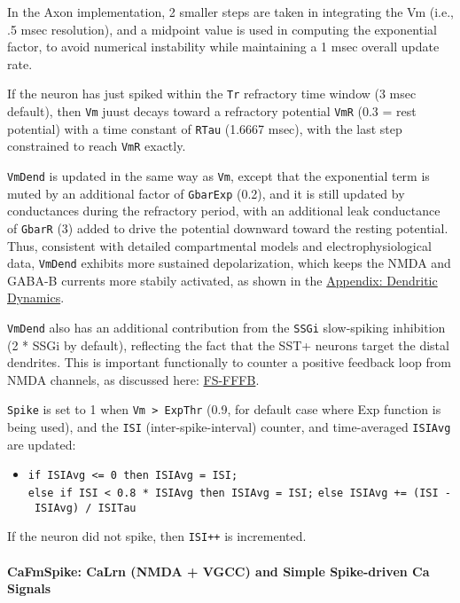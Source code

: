 \documentclass[11pt,twoside]{article}
\newif\myifpdf
\begin{document}
In the Axon implementation, 2 smaller steps are taken in integrating the
Vm (i.e., .5 msec resolution), and a midpoint value is used in computing
the exponential factor, to avoid numerical instability while maintaining
a 1 msec overall update rate.

If the neuron has just spiked within the \texttt{Tr} refractory time
window (3 msec default), then \texttt{Vm} juust decays toward a
refractory potential \texttt{VmR} (0.3 = rest potential) with a time
constant of \texttt{RTau} (1.6667 msec), with the last step constrained
to reach \texttt{VmR} exactly.

\texttt{VmDend} is updated in the same way as \texttt{Vm}, except that
the exponential term is muted by an additional factor of
\texttt{GbarExp} (0.2), and it is still updated by conductances during
the refractory period, with an additional leak conductance of
\texttt{GbarR} (3) added to drive the potential downward toward the
resting potential. Thus, consistent with detailed compartmental models
and electrophysiological data, \texttt{VmDend} exhibits more sustained
depolarization, which keeps the NMDA and GABA-B currents more stabily
activated, as shown in the
\protect\hyperlink{appendix-dendritic-dynamics}{Appendix: Dendritic
Dynamics}.

\texttt{VmDend} also has an additional contribution from the
\texttt{SSGi} slow-spiking inhibition (2 * SSGi by default), reflecting
the fact that the SST+ neurons target the distal dendrites. This is
important functionally to counter a positive feedback loop from NMDA
channels, as discussed here:
\href{https://github.com/emer/axon/tree/master/fsfffb}{FS-FFFB}.

\texttt{Spike} is set to 1 when \texttt{Vm\ \textgreater{}\ ExpThr}
(0.9, for default case where Exp function is being used), and the
\texttt{ISI} (inter-spike-interval) counter, and time-averaged
\texttt{ISIAvg} are updated:

\begin{itemize}
\tightlist
\item
  \texttt{if\ ISIAvg\ \textless{}=\ 0\ then\ ISIAvg\ =\ ISI;}
  \texttt{else\ if\ ISI\ \textless{}\ 0.8\ *\ ISIAvg\ then\ ISIAvg\ =\ ISI;}
  \texttt{else\ ISIAvg\ +=\ (ISI\ -\ ISIAvg)\ /\ ISITau}
\end{itemize}

If the neuron did not spike, then \texttt{ISI++} is incremented.

\hypertarget{cafmspike-calrn-nmda--vgcc-and-simple-spike-driven-ca-signals}{%
\paragraph{CaFmSpike: CaLrn (NMDA + VGCC) and Simple Spike-driven Ca
Signals}\label{cafmspike-calrn-nmda--vgcc-and-simple-spike-driven-ca-signals}}
\end{document}
